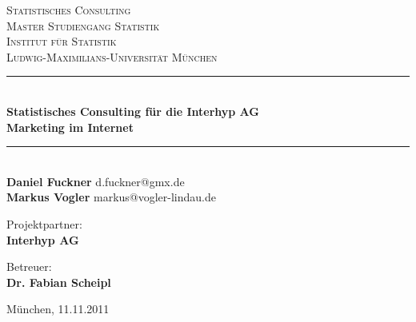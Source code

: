 \begin{titlepage}
	\rmfamily
	\begin{center}
	
		\textsc{\LARGE Statistisches Consulting}\\[1.5cm]

		\textsc{
			\large{	Master Studiengang Statistik\\[0.25cm]
							Institut für Statistik\\[0.25cm]
							Ludwig-Maximilians-Universität München}}\\[0.25cm]
						
		\newcommand{\HRule}{\rule{\linewidth}{0.5mm}}
		\HRule \\[0.4cm]
		{\huge \bfseries Statistisches Consulting für die Interhyp AG\\[0.5cm]Marketing im Internet}\\[0.4cm]
		\HRule \\[1.5cm]
		
		\textbf{Daniel Fuckner} d.fuckner@gmx.de\\
		\textbf{Markus Vogler} markus@vogler-lindau.de\\[1.5cm]
	
		\begin{minipage}{0.4\textwidth}
			\begin{flushleft}
				Projektpartner:\\
				\textbf{Interhyp AG}
			\end{flushleft}
		\end{minipage}
		\hfill
		\begin{minipage}{0.4\textwidth}
			\begin{flushright}
				Betreuer:\\
				\textbf{Dr. Fabian Scheipl}
			\end{flushright}
		\end{minipage}
		
		\vfill

		{\large München, 11.11.2011}
		
	\end{center}
\end{titlepage}